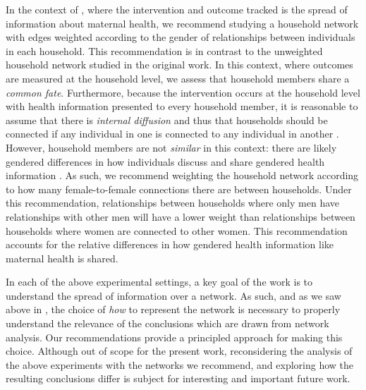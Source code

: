 In the context of \citet{airoldi2024}, where the intervention and outcome tracked is the spread of information about maternal health, we recommend studying a household network with edges weighted according to the gender of relationships between individuals in each household. This recommendation is in contrast to the unweighted household network studied in the original work. In this context, where outcomes are measured at the household level, we assess that household members share a \textit{common fate}. Furthermore, because the intervention occurs at the household level with health information presented to every household member, it is reasonable to assume that there is \textit{internal diffusion} and thus that households should be connected if any individual in one is connected to any individual in another \citep[this is how households are connected in ]{airoldi2024}. However, household members are not \textit{similar} in this context: there are likely gendered differences in how individuals discuss and share gendered health information \citep[see, e.g.,][for a discussion of how gender plays a role in family-planning decisions, discussions, and outcomes in Honduras]{berti2015adequacy}. As such, we recommend weighting the household network according to how many female-to-female connections there are between households. Under this recommendation, relationships between households where only men have relationships with other men will have a lower weight than relationships between households where women are connected to other women. This recommendation accounts for the relative differences in how gendered health information like maternal health is shared.

In each of the above experimental settings, a key goal of the work is to understand the spread of information over a network. As such, and as we saw above in , the choice of \textit{how} to represent the network is necessary to properly understand the relevance of the conclusions which are drawn from network analysis. Our recommendations provide a principled approach for making this choice. Although out of scope for the present work, reconsidering the analysis of the above experiments with the networks we recommend, and exploring how the resulting conclusions differ is subject for interesting and important future work.


